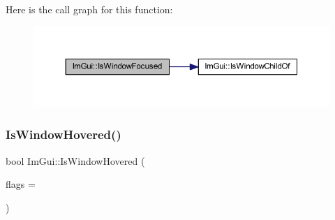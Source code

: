 Here is the call graph for this function\+:
\nopagebreak
\begin{figure}[H]
\begin{center}
\leavevmode
\includegraphics[width=350pt]{namespace_im_gui_a51ed119ab4be7fcf47a34644e262c87e_cgraph}
\end{center}
\end{figure}
\mbox{\label{namespace_im_gui_aaed1ebf40cc2cb2ec30b0ba39b91d4a5}} 
\subsubsection{\texorpdfstring{Is\+Window\+Hovered()}{IsWindowHovered()}}
{\footnotesize\ttfamily bool Im\+Gui\+::\+Is\+Window\+Hovered (\begin{DoxyParamCaption}\item[{\mbox{\hyperlink{imgui_8h_a3a8f688665e5ea0bd9700e1251580a2c}{Im\+Gui\+Hovered\+Flags}}}]{flags = {} }\end{DoxyParamCaption})}

